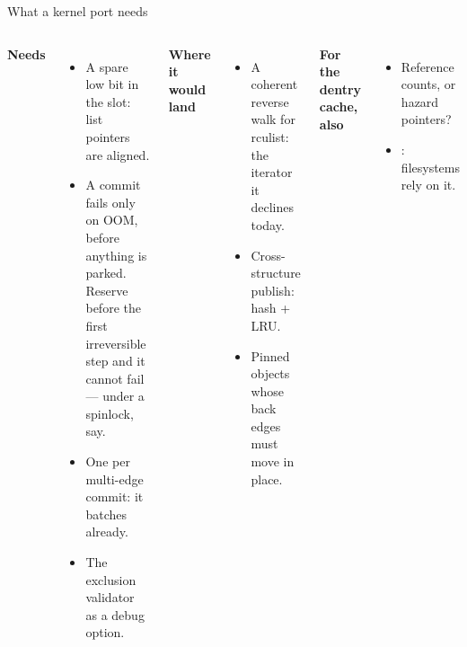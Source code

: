 \documentclass[aspectratio=169, 10pt, t, xcolor=table]{beamer}
\begin{document}
\begin{frame}{What a kernel port needs}
\begin{columns}[T, onlytextwidth]
  {\bfseries Needs\par}
  \vspace{1mm}
  \begin{itemize}\small
  \item A spare low bit in the slot: list pointers are aligned.
  \item A commit fails only on OOM, before anything is parked. Reserve
        before the first irreversible step and it cannot fail --- under a
        spinlock, say.
  \item One  per multi-edge commit: it batches already.
  \item The exclusion validator as a debug option.
  \end{itemize}
  {\bfseries Where it would land\par}
  \vspace{1mm}
  \begin{itemize}\small
  \item A coherent reverse walk for rculist: the iterator it declines
        today.
  \item Cross-structure publish: hash + LRU.
  \item Pinned objects whose back edges must move in place.
  \end{itemize}
  \vspace{1mm}
  {\bfseries For the dentry cache, also\par}
  \vspace{0.5mm}
  \begin{itemize}\small
  \item Reference counts, or hazard pointers?
  \item {}: filesystems rely on it.
  \end{itemize}
\end{columns}
\label{fr:kport}
\end{frame}
\end{document}
